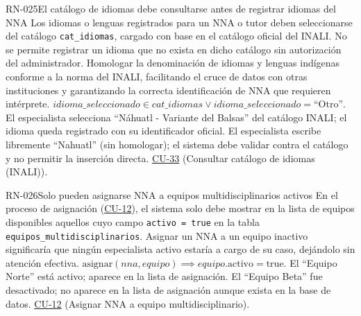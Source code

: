 \begin{BussinesRule}[%
	\brClassification{\btEnabler}{\bcCondition}{\blStrict}%
	]{RN-025}{El catálogo de idiomas debe consultarse antes de registrar idiomas del NNA}
	\BRitem[Descripción:] Los idiomas o lenguas registrados para un NNA o tutor deben seleccionarse del catálogo \texttt{cat\_idiomas}, cargado con base en el catálogo oficial del INALI. No se permite registrar un idioma que no exista en dicho catálogo sin autorización del administrador.
	\BRitem[Motivación:] Homologar la denominación de idiomas y lenguas indígenas conforme a la norma del INALI, facilitando el cruce de datos con otras instituciones y garantizando la correcta identificación de NNA que requieren intérprete.
	\BRitem[Sentencia:] $idioma\_seleccionado \in cat\_idiomas \lor idioma\_seleccionado = \text{``Otro''}$.
	 El especialista selecciona ``Náhuatl - Variante del Balsas'' del catálogo INALI; el idioma queda registrado con su identificador oficial.
	 El especialista escribe libremente ``Nahuatl'' (sin homologar); el sistema debe validar contra el catálogo y no permitir la inserción directa.
	 \hyperlink{CU-33}{CU-33} (Consultar catálogo de idiomas (INALI)).
\end{BussinesRule}

\begin{BussinesRule}[%
	\brClassification{\btEnabler}{\bcCondition}{\blStrict}%
	]{RN-026}{Solo pueden asignarse NNA a equipos multidisciplinarios activos}
	\BRitem[Descripción:] En el proceso de asignación (\hyperlink{CU-12}{CU-12}), el sistema solo debe mostrar en la lista de equipos disponibles aquellos cuyo campo \texttt{activo = true} en la tabla \texttt{equipos\_multidisciplinarios}.
	\BRitem[Motivación:] Asignar un NNA a un equipo inactivo significaría que ningún especialista activo estaría a cargo de su caso, dejándolo sin atención efectiva.
	\BRitem[Sentencia:] $\text{asignar}(nna, equipo) \implies equipo.\text{activo} = \text{true}$.
	 El ``Equipo Norte'' está activo; aparece en la lista de asignación.
	 El ``Equipo Beta'' fue desactivado; no aparece en la lista de asignación aunque exista en la base de datos.
	 \hyperlink{CU-12}{CU-12} (Asignar NNA a equipo multidisciplinario).
\end{BussinesRule}

